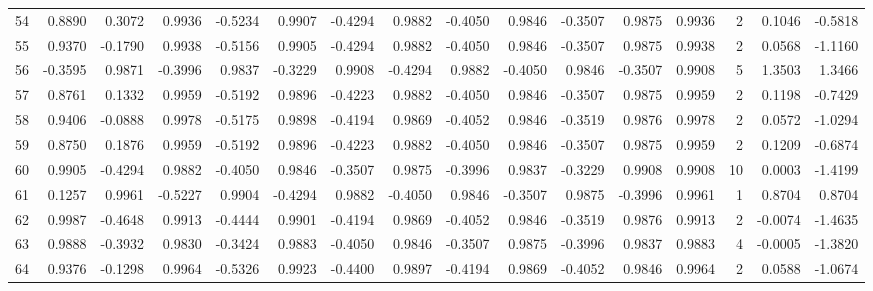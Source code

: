 \begin{tabular}{lrrrrrrrrrrrrrrr}
54  &      0.8890 &  0.3072 &  0.9936 & -0.5234 &  0.9907 & -0.4294 &  0.9882 & -0.4050 &  0.9846 & -0.3507 &   0.9875 &     0.9936 &      2 &                    0.1046 &                    -0.5818 \\
55  &      0.9370 & -0.1790 &  0.9938 & -0.5156 &  0.9905 & -0.4294 &  0.9882 & -0.4050 &  0.9846 & -0.3507 &   0.9875 &     0.9938 &      2 &                    0.0568 &                    -1.1160 \\
56  &     -0.3595 &  0.9871 & -0.3996 &  0.9837 & -0.3229 &  0.9908 & -0.4294 &  0.9882 & -0.4050 &  0.9846 &  -0.3507 &     0.9908 &      5 &                    1.3503 &                     1.3466 \\
57  &      0.8761 &  0.1332 &  0.9959 & -0.5192 &  0.9896 & -0.4223 &  0.9882 & -0.4050 &  0.9846 & -0.3507 &   0.9875 &     0.9959 &      2 &                    0.1198 &                    -0.7429 \\
58  &      0.9406 & -0.0888 &  0.9978 & -0.5175 &  0.9898 & -0.4194 &  0.9869 & -0.4052 &  0.9846 & -0.3519 &   0.9876 &     0.9978 &      2 &                    0.0572 &                    -1.0294 \\
59  &      0.8750 &  0.1876 &  0.9959 & -0.5192 &  0.9896 & -0.4223 &  0.9882 & -0.4050 &  0.9846 & -0.3507 &   0.9875 &     0.9959 &      2 &                    0.1209 &                    -0.6874 \\
60  &      0.9905 & -0.4294 &  0.9882 & -0.4050 &  0.9846 & -0.3507 &  0.9875 & -0.3996 &  0.9837 & -0.3229 &   0.9908 &     0.9908 &     10 &                    0.0003 &                    -1.4199 \\
61  &      0.1257 &  0.9961 & -0.5227 &  0.9904 & -0.4294 &  0.9882 & -0.4050 &  0.9846 & -0.3507 &  0.9875 &  -0.3996 &     0.9961 &      1 &                    0.8704 &                     0.8704 \\
62  &      0.9987 & -0.4648 &  0.9913 & -0.4444 &  0.9901 & -0.4194 &  0.9869 & -0.4052 &  0.9846 & -0.3519 &   0.9876 &     0.9913 &      2 &                   -0.0074 &                    -1.4635 \\
63  &      0.9888 & -0.3932 &  0.9830 & -0.3424 &  0.9883 & -0.4050 &  0.9846 & -0.3507 &  0.9875 & -0.3996 &   0.9837 &     0.9883 &      4 &                   -0.0005 &                    -1.3820 \\
64  &      0.9376 & -0.1298 &  0.9964 & -0.5326 &  0.9923 & -0.4400 &  0.9897 & -0.4194 &  0.9869 & -0.4052 &   0.9846 &     0.9964 &      2 &                    0.0588 &                    -1.0674 \\

\end{tabular}
